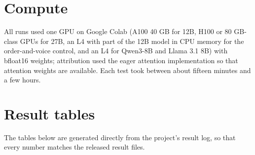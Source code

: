 \section{Compute}\label{app:compute}
All runs used one GPU on Google Colab (A100 40 GB for 12B, H100 or 80 GB-class GPUs for 27B, an L4 with part of
the 12B model in CPU memory for the order-and-voice control, and an L4 for Qwen3-8B and Llama 3.1 8B) with bfloat16 weights; attribution used the eager
attention implementation so that attention weights are available. Each test took between about fifteen minutes and a
few hours.

\section{Result tables}\label{app:tables}
The tables below are generated directly from the project's result log, so that every number matches the released
result files.



